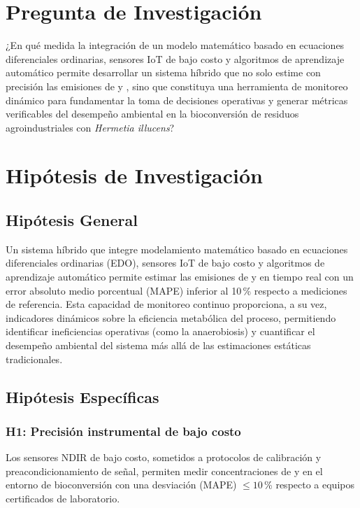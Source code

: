 \chapter{Pregunta de Investigación}

¿En qué medida la integración de un modelo matemático basado en ecuaciones diferenciales ordinarias, sensores IoT de bajo costo y algoritmos de aprendizaje automático permite desarrollar un sistema híbrido que no solo estime con precisión las emisiones de  y , sino que constituya una herramienta de monitoreo dinámico para fundamentar la toma de decisiones operativas y generar métricas verificables del desempeño ambiental en la bioconversión de residuos agroindustriales con \textit{Hermetia illucens}?

\chapter{Hipótesis de Investigación}

\section{Hipótesis General}

Un sistema híbrido que integre modelamiento matemático basado en ecuaciones diferenciales ordinarias (EDO), sensores IoT de bajo costo y algoritmos de aprendizaje automático permite estimar las emisiones de  y  en tiempo real con un error absoluto medio porcentual (MAPE) inferior al 10\,\% respecto a mediciones de referencia. Esta capacidad de monitoreo continuo proporciona, a su vez, indicadores dinámicos sobre la eficiencia metabólica del proceso, permitiendo identificar ineficiencias operativas (como la anaerobiosis) y cuantificar el desempeño ambiental del sistema más allá de las estimaciones estáticas tradicionales.

\section{Hipótesis Específicas}
\subsection{H1: Precisión instrumental de bajo costo}
Los sensores NDIR de bajo costo, sometidos a protocolos de calibración y preacondicionamiento de señal, permiten medir concentraciones de  y  en el entorno de bioconversión con una desviación (MAPE) $\leq 10$\,\% respecto a equipos certificados de laboratorio.

